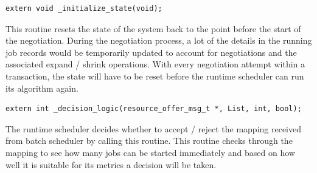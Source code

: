 \begin{lstlisting}[mathescape,frame=single]
extern void _initialize_state(void);
\end{lstlisting}
This routine resets the state of the system back to the point before the start of the negotiation. During the negotiation process, a lot of the details in the running job records would be temporarily updated to account for negotiations and the associated expand / shrink operations. With every negotiation attempt within a transaction, the state will have to be reset before the runtime scheduler can run its algorithm again.\\
\begin{lstlisting}[mathescape,frame=single]
extern int _decision_logic(resource_offer_msg_t *, List, int, bool);
\end{lstlisting}
The runtime scheduler decides whether to accept / reject the mapping received from batch scheduler by calling this routine. This routine checks through the mapping to see how many jobs can be started immediately and based on how well it is suitable for its metrics a decision will be taken.
